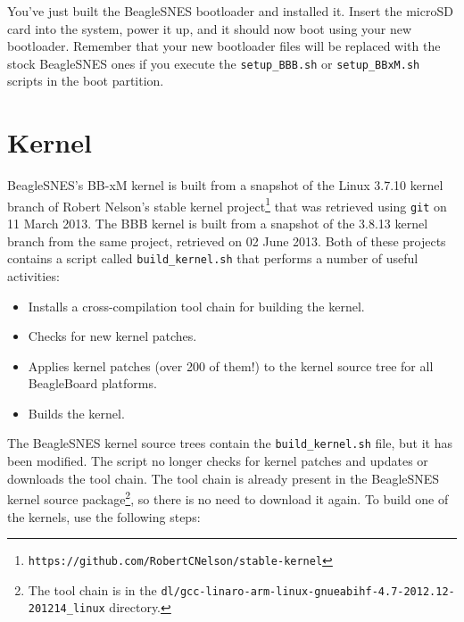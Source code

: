 \noindent{}You've just built the BeagleSNES bootloader and installed it.  Insert the microSD card into the system, power it up, and it should now boot using your new bootloader.  Remember that your new bootloader files will be replaced with the stock BeagleSNES ones if you execute the \texttt{setup\_BBB.sh} or \texttt{setup\_BBxM.sh} scripts in the boot partition.

\section{Kernel}

BeagleSNES's BB-xM kernel is built from a snapshot of the Linux 3.7.10 kernel branch of Robert Nelson's stable kernel project\footnote{\texttt{https://github.com/RobertCNelson/stable-kernel}} that was retrieved using \texttt{git} on 11 March 2013.  The BBB kernel is built from a snapshot of the 3.8.13 kernel branch from the same project, retrieved on 02 June 2013.  Both of these projects contains a script called \texttt{build\_kernel.sh} that performs a number of useful activities:

\begin{itemize}
\item Installs a cross-compilation tool chain for building the kernel.
\item Checks for new kernel patches.
\item Applies kernel patches (over 200 of them!) to the kernel source tree for all BeagleBoard platforms.
\item Builds the kernel.
\end{itemize} 
 
\noindent{}The BeagleSNES kernel source trees contain the \texttt{build\_kernel.sh} file, but it has been modified.  The script no longer checks for kernel patches and updates or downloads the tool chain.  The tool chain is already present in the BeagleSNES kernel source package\footnote{The tool chain is in the \texttt{dl/gcc-linaro-arm-linux-gnueabihf-4.7-2012.12-201214\_linux} directory.}, so there is no need to download it again.  To build one of the kernels, use the following steps:

